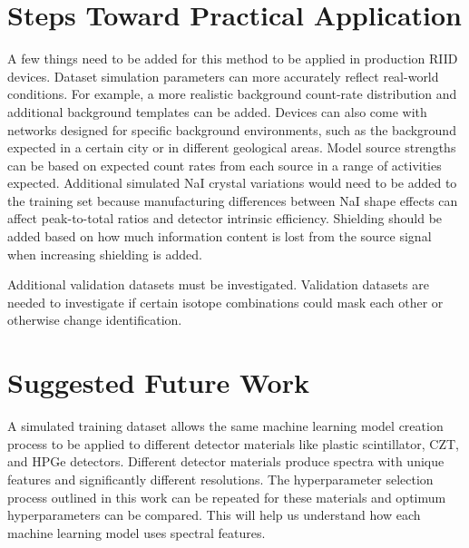 \section{Steps Toward Practical Application}

A few things need to be added for this method to be applied in production RIID devices. Dataset simulation parameters can more accurately reflect real-world conditions. For example, a more realistic background count-rate distribution and additional background templates can be added. Devices can also come with networks designed for specific background environments, such as the background expected in a certain city or in different geological areas. Model source strengths can be based on expected count rates from each source in a range of activities expected. Additional simulated NaI crystal variations would need to be added to the training set because manufacturing differences between NaI shape effects can affect peak-to-total ratios and detector intrinsic efficiency. Shielding should be added based on how much information content is lost from the source signal when increasing shielding is added.

Additional validation datasets must be investigated. Validation datasets are needed to investigate if certain isotope combinations could mask each other or otherwise change identification. 





\section{Suggested Future Work}

A simulated training dataset allows the same machine learning model creation process to be applied to different detector materials like plastic scintillator, CZT, and HPGe detectors. Different detector materials produce spectra with unique features and significantly different resolutions. The hyperparameter selection process outlined in this work can be repeated for these materials and optimum hyperparameters can be compared. This will help us understand how each machine learning model uses spectral features.

